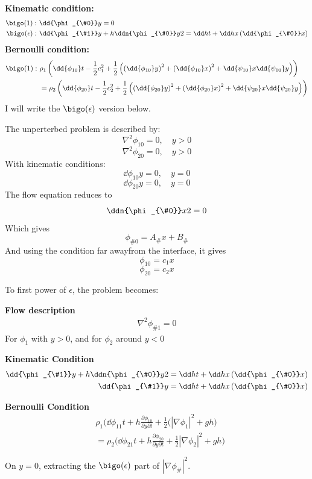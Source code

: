 \documentclass{/home/janmebows/Documents/LatexTemplates/myassignment}
\begin{document}
\begin{enumerate}
\begin{enumerate}
        \textbf{Kinematic condition:}
        \begin{align*}
            \bigo(1):\ &\dd{\phi_{\#0}}y = 0\\
            \bigo(\epsilon):\ &\dd{\phi_{\#1}}y + h\ddn{\phi_{\#0}}y2 = \dd ht + \dd hx\left(\dd{\phi_{\#0}}x\right)
        \end{align*}
        \textbf{Bernoulli condition:}
        \begin{align*}
            \bigo(1):\ &\rho_1\left(\dd{\phi_{10}}t - \frac12 c_1^2 + \frac12\left(\left(\dd{\phi_{10}}y\right)^2 + \left(\dd{\phi_{10}}x\right)^2 + \dd{\psi_{10}}x \dd{\psi_{10}}y \right)\right)\\
            &=\rho_2\left(\dd{\phi_{20}}t - \frac12 c_2^2 + \frac12\left(\left(\dd{\phi_{20}}y\right)^2 + \left(\dd{\phi_{20}}x\right)^2 + \dd{\psi_{20}}x \dd{\psi_{20}}y \right)\right)\\
        \end{align*}
        I will write the $\bigo(\epsilon)$ version below.

        The unperterbed problem is described by:
        \[\nabla^2\phi_{10} = 0, \quad y >0\]
        \[\nabla^2\phi_{20} = 0, \quad y >0\]
        With kinematic conditions:
        \[\dd{\phi_{10}} y  =  0, \quad y=0\]
        \[\dd{\phi_{20}} y  =  0, \quad y=0\]
        The flow equation reduces to
        \[\ddn{\phi_{\#0}}x2 = 0\]
        Which gives
        \[\phi_{\#0} = A_{\#} x + B_{\#}\]
        And using the condition far awayfrom the interface, it gives
        \[\phi_{10} = c_1 x\]
        \[\phi_{20} = c_2 x\]

        To first power of $\epsilon$, the problem becomes:


        \textbf{Flow description}
        \begin{align*}
            \nabla^2 \phi_{\#1} = 0
        \end{align*}
        For $\phi_1$ with $y > 0$, and for $\phi_2$ around $y < 0$

        \textbf{Kinematic Condition}
        \begin{align*}
            \dd{\phi_{\#1}}y + h\ddn{\phi_{\#0}}y2 = \dd ht + \dd hx\left(\dd{\phi_{\#0}}x\right)\\
            \dd{\phi_{\#1}}y = \dd ht + \dd hx\left(\dd{\phi_{\#0}}x\right)
        \end{align*}
        


        
        \textbf{Bernoulli Condition}
        \begin{align*}
        &\rho_1\Big(\dd{\phi_{11}}t + h\frac{\partial \phi_{10}}{\partial y\partial t} + \frac12(|\nabla \phi_1|^2+ gh\Big)\\
            &=\rho_2\Big(\dd{\phi_{21}}t + h\frac{\partial \phi_{20}}{\partial y\partial t} + \frac12 |\nabla\phi_2|^2+ gh\Big)\\\\
        \end{align*}
        On $y=0$, extracting the $\bigo(\epsilon)$ part of $|\nabla\phi_{\#}|^2$.


\end{enumerate}
\end{enumerate}
\end{document}
